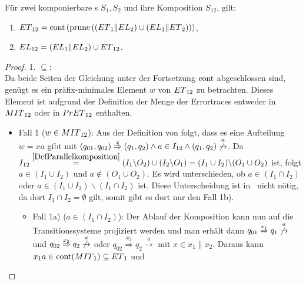 \begin{satz}
\label{satzErrorSemanik}
  Für zwei komponierbare \EIO{}s $S_1, S_2$ und ihre Komposition
  $S_{12}$, gilt:
  \begin{enumerate}
    \item
      $ET{}_{12}=\mathrm{cont}{}\left(\mathrm{prune}{}\left(\left(ET{}_1\|EL{}_2\right)\cup
      \left(EL{}_1\|ET{}_2\right)\right)\right)$,
    \item $EL{}_{12}=(EL{}_1\|EL{}_2)\cup ET{}_{12}$.
  \end{enumerate}
\end{satz}

\begin{proof}
  1. \glqq{}$\subseteq$\grqq{}:\\
  Da beide Seiten der Gleichung unter der Fortsetzung $\mathrm{cont}{}$ abgeschlossen sind, genügt es ein
  präfix-minimales Element $w$ von $ET{}_{12}$ zu betrachten. Dieses Element ist
  aufgrund der Definition der Menge der Errortraces entweder in $MIT{}_{12}$ oder in
  $PrET{}_{12}$ enthalten.
  \begin{itemize}
    \item Fall 1 ($w\in MIT{}_{12}$): Aus der Definition von \MIT{} folgt, dass es eine
  Aufteilung $w=xa$ gibt mit $(q_{01},q_{02})
  \overset{x}{\Rightarrow}(q_1,q_2)\wedge a\in I_{12}\wedge (q_1,q_2)
  \overset{a}{\not{\hspace{-0.1cm}\rightarrow}}$. Da $I_{12}
  \overset{\ref{DefParallelkomposition}}{=}(I_1\backslash O_2)\cup
  (I_2\backslash O_1)=(I_1\cup I_2)\backslash (O_1\cup O_2)$ ist, folgt $a\in (I_1\cup
  I_2)$ und $a\notin (O_1\cup O_2)$. Es wird unterschieden, ob $a\in (I_1\cap I_2)$
  oder $a\in (I_1\cup I_2)\backslash (I_1\cap I_2)$ ist. Diese Unterscheidung
  ist in~\cite{Vogler2014EIO} nicht nötig, da dort $I_1\cap I_2=\emptyset$
  gilt, somit gibt es dort nur den Fall 1b).
  \begin{itemize}
    \item Fall 1a) ($a\in (I_1\cap I_2)$): Der Ablauf der Komposition kann nun
      auf die Transitionssysteme projiziert werden und man erhält dann \oBdA{}
      $q_{01}\overset{x_1}{\Rightarrow} q_1
      \overset{a}{\not{\hspace{-0.1cm}\rightarrow}}$ und
      $q_{02}\overset{x_2}{\Rightarrow} q_2
      \overset{a}{\not{\hspace{-0.1cm}\rightarrow}}$ oder
      $q_{02}\overset{x_2}{\Rightarrow} q_2 \overset{a}{\rightarrow}$ mit $x\in
      x_1\|x_2$. Daraus kann $x_1a\in \mathrm{cont}{}(MIT{}_1)\subseteq ET{}_1$ und

\end{itemize}
\end{itemize}
\end{proof}
